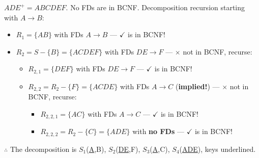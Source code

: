 \begin{theorem}
    $ADE^+ = ABCDEF$. No FDs are in BCNF. Decomposition recursion starting with $A \to B$:
    \begin{itemize}
        \item $R_1 = \{AB\}$ with FDs $A \to B$ --- $\checkmark$ is in BCNF!
        \item $R_2 = S - \{B\} = \{ACDEF\}$ with FDs $DE \to F$ --- $\times$ not in BCNF, recurse:
              \begin{itemize}
                  \item $R_{2,1} = \{DEF\}$ with FDs $DE \to F$ --- $\checkmark$ is in BCNF!
                  \item $R_{2,2} = R_2 - \{F\} = \{ACDE\}$ with FDs $A \to C$ (\textbf{implied!}) --- $\times$ not in BCNF, recurse:
                        \begin{itemize}
                            \item $R_{2,2,1} = \{AC\}$ with FDs $A \to C$ --- $\checkmark$ is in BCNF!
                            \item $R_{2,2,2} = R_2 - \{C\} = \{ADE\}$ with \textbf{no FDs} --- $\checkmark$ is in BCNF!
                        \end{itemize}
              \end{itemize}
    \end{itemize}

    $\therefore$ The decomposition is $S_1$(\underline{A},B), $S_2$(\underline{DE},F), $S_3$(\underline{A},C), $S_4$(\underline{ADE}), keys underlined.



\end{theorem}
